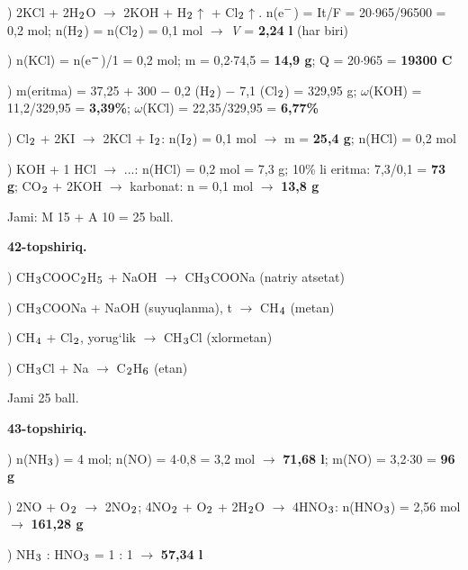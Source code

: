 \documentclass[11pt,a4paper]{article}
\renewcommand{\textsubscript}[1]{\ensuremath{_{\text{\fontsize{8}{8}\selectfont #1}}}}
\renewcommand{\textsuperscript}[1]{\ensuremath{^{\text{\fontsize{8}{8}\selectfont #1}}}}
\begin{document}
) 2KCl + 2H\textsubscript{2}O $\to$ 2KOH + H\textsubscript{2}$\uparrow$ + Cl\textsubscript{2}$\uparrow$. n(e\textsuperscript{$-$}) = It/F = 20$\cdot$965/96500 = 0,2 mol; n(H\textsubscript{2}) = n(Cl\textsubscript{2}) = 0,1 mol $\to$ \textit{V} = \textbf{2,24 l} (har biri)\par
{}) n(KCl) = n(e\textsuperscript{$-$})/1 = 0,2 mol; m = 0,2$\cdot$74,5 = \textbf{14,9 g}; Q = 20$\cdot$965 = \textbf{19300 C}\par
{}) m(eritma) = 37,25 + 300 $-$ 0,2 (H\textsubscript{2}) $-$ 7,1 (Cl\textsubscript{2}) = 329,95 g; $\omega$(KOH) = 11,2/329,95 = \textbf{3,39\%}; $\omega$(KCl) = 22,35/329,95 = \textbf{6,77\%}\par
{}) Cl\textsubscript{2} + 2KI $\to$ 2KCl + I\textsubscript{2}: n(I\textsubscript{2}) = 0,1 mol $\to$ m = \textbf{25,4 g}; n(HCl) = 0,2 mol\par
{}) KOH + 1 HCl $\to$ ...: n(HCl) = 0,2 mol = 7,3 g; 10\% li eritma: 7,3/0,1 = \textbf{73 g}; CO\textsubscript{2} + 2KOH $\to$ karbonat: n = 0,1 mol $\to$ \textbf{13,8 g}\par
\noindent Jami: M 15 + A 10 = 25 ball.\par
\noindent\textbf{42-topshiriq.}\par
{}) CH\textsubscript{3}COOC\textsubscript{2}H\textsubscript{5} + NaOH $\to$ CH\textsubscript{3}COONa (natriy atsetat)\par
{}) CH\textsubscript{3}COONa + NaOH (suyuqlanma), t\textdegree{} $\to$ CH\textsubscript{4} (metan)\par
{}) CH\textsubscript{4} + Cl\textsubscript{2}, yorug`lik $\to$ CH\textsubscript{3}Cl (xlormetan)\par
{}) CH\textsubscript{3}Cl + Na $\to$ C\textsubscript{2}H\textsubscript{6} (etan)\par
\noindent Jami 25 ball.\par
\noindent\textbf{43-topshiriq.}\par
{}) n(NH\textsubscript{3}) = 4 mol; n(NO) = 4$\cdot$0,8 = 3,2 mol $\to$ \textbf{71,68 l}; m(NO) = 3,2$\cdot$30 = \textbf{96 g}\par
{}) 2NO + O\textsubscript{2} $\to$ 2NO\textsubscript{2}; 4NO\textsubscript{2} + O\textsubscript{2} + 2H\textsubscript{2}O $\to$ 4HNO\textsubscript{3}: n(HNO\textsubscript{3}) = 2,56 mol $\to$ \textbf{161,28 g}\par
{}) NH\textsubscript{3} : HNO\textsubscript{3} = 1 : 1 $\to$ \textbf{57,34 l}\par
\end{document}
